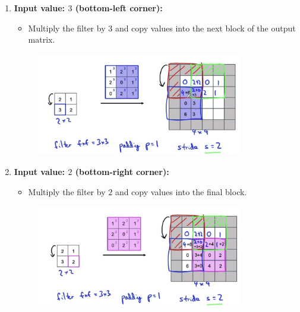 \documentclass[letterpaper,12pt,notitlepage,twoside]{report}
\begin{document}
\begin{enumerate}
    \item \textbf{Input value: $3$ (bottom-left corner):}
    \begin{itemize}
        \item Multiply the filter by $3$ and copy values into the next block of the output matrix.
    \end{itemize}
	\begin{figure}[h]
		\centering
		\includegraphics[width=0.85\textwidth]{Images/Transpose Convolution - Step 3.png}
		\label{fig:48}
	\end{figure}
	\FloatBarrier

    \item \textbf{Input value: $2$ (bottom-right corner):}
    \begin{itemize}
        \item Multiply the filter by $2$ and copy values into the final block.
    \end{itemize}

	\begin{figure}[h]
		\centering
		\includegraphics[width=0.85\textwidth]{Images/Transpose Convolution - Step 4.png}
		\label{fig:49}
	\end{figure}
	\FloatBarrier


\end{enumerate}
\end{document}
